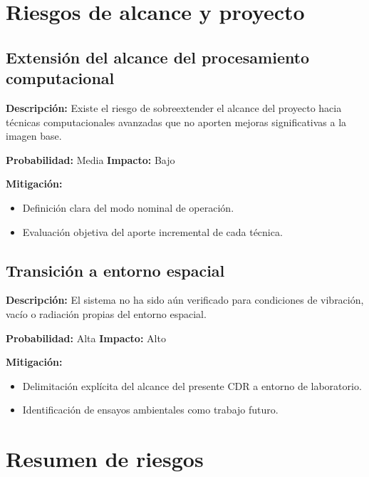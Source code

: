 \section{Riesgos de alcance y proyecto}

\subsection{Extensión del alcance del procesamiento computacional}

\textbf{Descripción:}  
Existe el riesgo de sobreextender el alcance del proyecto hacia técnicas
computacionales avanzadas que no aporten mejoras significativas a la imagen base.

\textbf{Probabilidad:} Media  
\textbf{Impacto:} Bajo  

\textbf{Mitigación:}
\begin{itemize}
    \item Definición clara del modo nominal de operación.
    \item Evaluación objetiva del aporte incremental de cada técnica.
\end{itemize}

\subsection{Transición a entorno espacial}

\textbf{Descripción:}  
El sistema no ha sido aún verificado para condiciones de vibración, vacío o
radiación propias del entorno espacial.

\textbf{Probabilidad:} Alta  
\textbf{Impacto:} Alto  

\textbf{Mitigación:}
\begin{itemize}
    \item Delimitación explícita del alcance del presente CDR a entorno de
    laboratorio.
    \item Identificación de ensayos ambientales como trabajo futuro.
\end{itemize}

\section{Resumen de riesgos}

